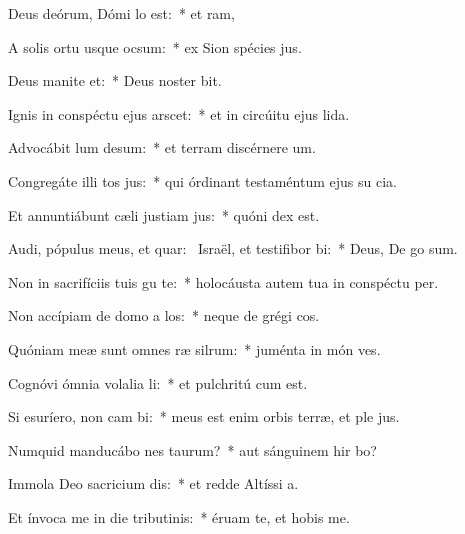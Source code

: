 \item Deus deórum, Dómi lo est:~* et  ram,
\item A solis ortu usque  ocsum:~* ex Sion spécies  jus.
\item Deus manite et:~* Deus noster   bit.
\item Ignis in conspéctu ejus arscet:~* et in circúitu ejus  lida.
\item Advocábit lum desum:~* et terram discérnere  um.
\item Congregáte illi tos jus:~* qui órdinant testaméntum ejus su cia.
\item Et annuntiábunt cæli justiam jus:~* quóni  dex est.
\item Audi, pópulus meus, et quar:~\pscross{} Israël, et testifibor bi:~* Deus, De  go sum.
\item Non in sacrifíciis tuis gu te:~* holocáusta autem tua in conspéctu   per.
\item Non accípiam de domo a los:~* neque de grégi  cos.
\item Quóniam meæ sunt omnes ræ silrum:~* juménta in món  ves.
\item Cognóvi ómnia volalia li:~* et pulchritú  cum est.
\item Si esuríero, non cam bi:~* meus est enim orbis terræ, et ple jus.
\item Numquid manducábo nes taurum?~* aut sánguinem hir bo?
\item Immola Deo sacricium dis:~* et redde Altíssi  a.
\item Et ínvoca me in die tributinis:~* éruam te, et hobis me.
